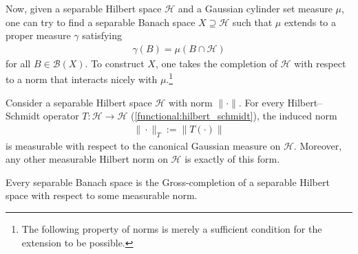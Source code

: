     Now, given a separable Hilbert space $\mathcal{H}$ and a Gaussian cylinder set measure $\mu$, one can try to find a separable Banach space $X\supseteq\mathcal{H}$ such that $\mu$ extends to a proper measure $\gamma$ satisfying
    \begin{gather}
        \gamma(B)=\mu(B\cap\mathcal{H})
    \end{gather}
    for all $B\in\mathcal{B}(X)$. To construct $X$, one takes the completion of $\mathcal{H}$ with respect to a norm that interacts nicely with $\mu$.\footnote{The following property of norms is merely a sufficient condition for the extension to be possible.}

    \begin{example}
        Consider a separable Hilbert space $\mathcal{H}$ with norm $\|\cdot\|$. For every Hilbert--Schmidt operator $T:\mathcal{H}\rightarrow\mathcal{H}$ (\cref{functional:hilbert_schmidt}), the induced norm
        \begin{gather}
            \|\cdot\|_T := \|T(\cdot)\|
        \end{gather}
        is measurable with respect to the canonical Gaussian measure on $\mathcal{H}$. Moreover, any other measurable Hilbert norm on $\mathcal{H}$ is exactly of this form.
    \end{example}

    \begin{property}
        Every separable Banach space is the Gross-completion of a separable Hilbert space with respect to some measurable norm. 
    \end{property}


